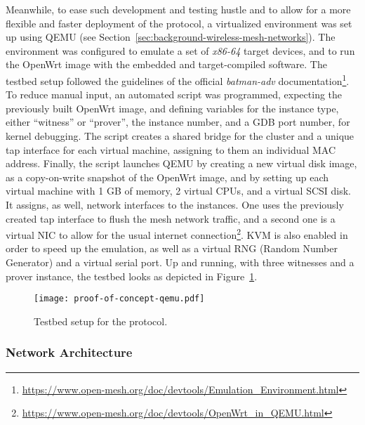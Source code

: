 Meanwhile, to ease such development and testing hustle and to allow for a more flexible and faster deployment of the protocol, a virtualized environment was set up using QEMU (see Section~\ref{sec:background-wireless-mesh-networks}). The environment was configured to emulate a set of \emph{x86-64} target devices, and to run the OpenWrt image with the embedded and target-compiled \pol{} software. The testbed setup followed the guidelines of the official \emph{batman-adv} documentation\footnote{\url{https://www.open-mesh.org/doc/devtools/Emulation_Environment.html}}. To reduce manual input, an automated script was programmed, expecting the previously built OpenWrt image, and defining variables for the instance type, either “witness” or “prover”, the instance number, and a GDB port number, for kernel debugging. The script creates a shared bridge for the cluster and a unique tap interface for each virtual machine, assigning to them an individual MAC address. Finally, the script launches QEMU by creating a new virtual disk image, as a copy-on-write snapshot of the OpenWrt image, and by setting up each virtual machine with 1 GB of memory, 2 virtual CPUs, and a virtual SCSI disk. It assigns, as well, network interfaces to the instances. One uses the previously created tap interface to flush the mesh network traffic, and a second one is a virtual NIC to allow for the usual internet connection\footnote{\url{https://www.open-mesh.org/doc/devtools/OpenWrt_in_QEMU.html}}. KVM is also enabled in order to speed up the emulation, as well as a virtual RNG (Random Number Generator) and a virtual serial port. Up and running, with three witnesses and a prover instance, the testbed looks as depicted in Figure~\ref{fig:infrastructure:testbed}.

\begin{figure}[h!]
    \begin{center}
    \texttt{[image: proof-of-concept-qemu.pdf]}
    \caption{Testbed setup for the \pol{} protocol.}
    \label{fig:infrastructure:testbed}
    \end{center}
\end{figure}

\subsubsection{Network Architecture} \label{sec:infrastructure:network-architecture}

